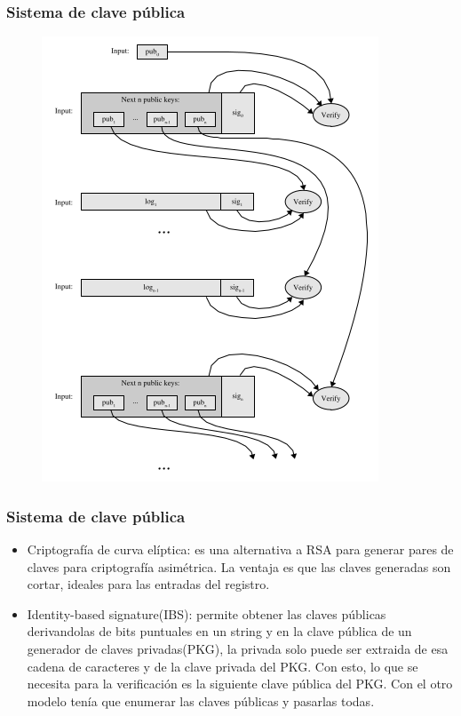 \documentclass[10pt, a4paper,english,spanish]{beamer}
\begin{document}
\begin{frame}
\frametitle{Sistema de clave pública}
\begin{figure}
  \includegraphics[scale=0.4]{imagenes/PublicKeyVerification.png}
\end{figure}
\end{frame}

\begin{frame}
\frametitle{Sistema de clave pública}
\begin{itemize}
  \item Criptografía de curva elíptica: es una alternativa a RSA para generar pares de claves para
  criptografía asimétrica. La ventaja es que las claves generadas son cortar, ideales para las entradas
  del registro.
  \item Identity-based signature(IBS): permite obtener las claves públicas derivandolas de bits puntuales en
  un string y en la clave pública de un generador de claves privadas(PKG), la privada solo puede ser extraida
  de esa cadena de caracteres y de la clave privada del PKG. Con esto, lo que se necesita
  para la verificación es la siguiente clave pública del PKG. Con el otro modelo tenía que enumerar las claves
  públicas y pasarlas todas.
\end{itemize}
\end{frame}
\end{document}
